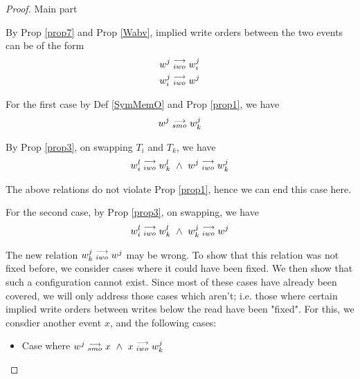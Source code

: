 \begin{proof}{Main part}
\begin{itemize}
                        By Prop \ref{prop7} and Prop \ref{Wabv}, implied write orders between the two events can be of the form 
                        \begin{align*}
                            w^j\stackrel{\longrightarrow}{_{iwo}}w_i^j \\
                            w_i^j\stackrel{\longrightarrow}{_{iwo}}w^j 
                        \end{align*}

                        For the first case by Def \ref{SymMemO} and Prop \ref{prop1}, we have
                        \begin{align*}
                            w^j\stackrel{\longrightarrow}{_{smo}}w_k^j
                        \end{align*}

                        By Prop \ref{prop3}, on swapping $T_i$ and $T_k$, we have 
                        \begin{align*}
                            \reln{w_i^l}{iwo}{w_k^l} \ \wedge \ \reln{w^j}{iwo}{w_k^j}
                        \end{align*}

                        The above relations do not violate Prop \ref{prop1}, hence we can end this case here. 

                        For the second case, by Prop \ref{prop3}, on swapping, we have 
                        \begin{align*}
                            \reln{w_i^l}{iwo}{w_k^l} \ \wedge \ \reln{w_k^j}{iwo}{w^j}
                        \end{align*}

                        The new relation $w_k^j\stackrel{\longrightarrow}{_{iwo}}w^j$ may be wrong. 
                        To show that this relation was not fixed before, we consider cases where it could have been fixed. We then show that such a configuration cannot exist. Since most of these cases have already been covered, we will only address those cases which aren't; i.e. those where certain implied write orders between writes below the read have been "fixed". For this, we consdier another event $x$, and the following cases:

                        \begin{itemize}
                            \item Case where $w^j\stackrel{\longrightarrow}{_{smo}}x \ \wedge \ x\stackrel{\longrightarrow}{_{iwo}}w_k^j$


\end{itemize}
\end{itemize}
\end{proof}
